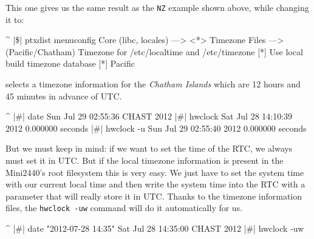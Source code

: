This one gives us the same result as the \texttt{NZ} example shown above, while
changing it to:

\begin{ptxshell}[escapechar=|]{^}
|\$| ptxdist menuconfig
  Core (libc, locales) --->
    <*> Timezone Files --->
      (Pacific/Chatham) Timezone for /etc/localtime and /etc/timezone
      [*]   Use local build timezone database
      [*]   Pacific
\end{ptxshell}

selects a timezone information for the \textit{Chatham Islands} which are 12
hours and 45 minutes in advance of UTC.

\begin{ptxshell}[escapechar=|]{^}
|\#| date
Sun Jul 29 02:55:36 CHAST 2012
|\#| hwclock
Sat Jul 28 14:10:39 2012  0.000000 seconds
|\#| hwclock -u
Sun Jul 29 02:55:40 2012  0.000000 seconds
\end{ptxshell}

But we must keep in mind: if we want to set the time of the RTC, we always
must set it in UTC. But if the local timezone information is present in the
Mini2440's root filesystem this is very easy. We just have to set the system
time with our current local time and then write the system time into the RTC
with a parameter that will really store it in UTC. Thanks to the timezone
information files, the \texttt{hwclock -uw} command will do it automatically
for us.

\begin{ptxshell}[escapechar=|]{^}
|\#| date "2012-07-28 14:35"
Sat Jul 28 14:35:00 CHAST 2012
|\#| hwclock -uw
\end{ptxshell}
